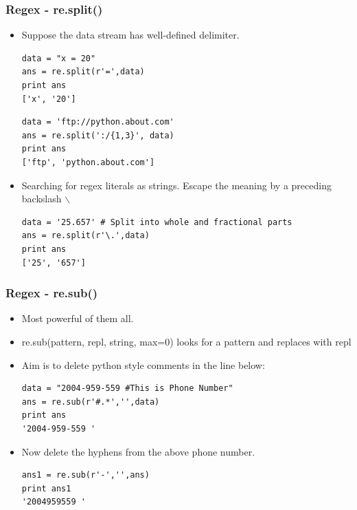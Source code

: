 \documentclass[xcolor=table]{beamer}
\begin{document}
\begin{frame}[fragile]
\frametitle{Regex -  re.split()}
\begin{itemize}
\item Suppose the data stream has well-defined delimiter.\\
\tiny
\begin{verbatim}
data = "x = 20"
ans = re.split(r'=',data)
print ans
['x', '20']
\end{verbatim}
\vspace{1mm}
\begin{verbatim} 
data = 'ftp://python.about.com'
ans = re.split(':/{1,3}', data)
print ans
['ftp', 'python.about.com']
\end{verbatim}
\small
\item Searching for regex literals as strings. Escape the meaning by a preceding backslash $\backslash$
\tiny
\begin{verbatim}
data = '25.657' # Split into whole and fractional parts
ans = re.split(r'\.',data)
print ans
['25', '657']
\end{verbatim}
\end{itemize}
\end{frame}

\begin{frame}[fragile]
\frametitle{Regex -  re.sub()}
\begin{itemize}
\item Most powerful of them all.
\item re.sub(pattern, repl, string, max=0) looks for a pattern and replaces with repl
\item Aim is to delete python style comments in the line below:\\
\tiny
\begin{verbatim}
data = "2004-959-559 #This is Phone Number"
ans = re.sub(r'#.*','',data)
print ans
'2004-959-559 '
\end{verbatim}
\small
\item Now delete the hyphens from the above phone number.\\
\tiny
\begin{verbatim}
ans1 = re.sub(r'-','',ans)
print ans1
'2004959559 '
\end{verbatim}
\end{itemize}
\end{frame}
\end{document}
